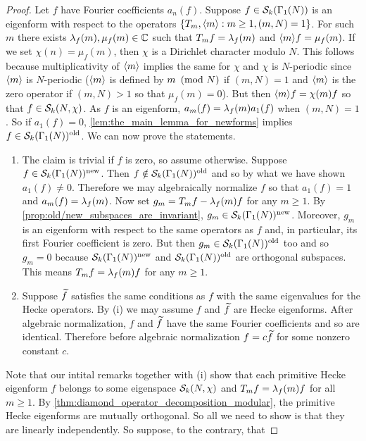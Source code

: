       \begin{proof}
        Let $f$ have Fourier coefficients $a_{n}(f)$. Suppose $f \in \mathcal{S}_{k}(\Gamma_{1}(N))$ is an eigenform with respect to the operators $\{T_{m},\langle m\rangle:m \ge 1, (m,N) = 1\}$. For such $m$ there exists $\lambda_{f}(m),\mu_{f}(m) \in \mathbb{C}$ such that $T_{m}f = \lambda_{f}(m)$ and $\langle m\rangle f = \mu_{f}(m)$. If we set $\chi(n) = \mu_{f}(m)$, then $\chi$ is a Dirichlet character modulo $N$. This follows because multiplicativity of $\langle m\rangle$ implies the same for $\chi$ and $\chi$ is $N$-periodic since $\langle m\rangle$ is $N$-periodic ($\langle m\rangle$ is defined by $m \ \left(\text{mod }N\right)$ if $(m,N) = 1$ and $\langle m\rangle$ is the zero operator if $(m,N) > 1$ so that $\mu_{f}(m) = 0$). But then $\langle m\rangle f = \chi(m)f$ so that $f \in \mathcal{S}_{k}(N,\chi)$. As $f$ is an eigenform, $a_{m}(f) = \lambda_{f}(m)a_{1}(f)$ when $(m,N) = 1$. So if $a_{1}(f) = 0$, \cref{lem:the_main_lemma_for_newforms} implies $f \in \mathcal{S}_{k}(\Gamma_{1}(N))^{\mathrm{old}}$. We can now prove the statements.
        \begin{enumerate}[label=(\roman*)]
          \item The claim is trivial if $f$ is zero, so assume otherwise. Suppose $f \in \mathcal{S}_{k}(\Gamma_{1}(N))^{\mathrm{new}}$. Then $f \notin \mathcal{S}_{k}(\Gamma_{1}(N))^{\mathrm{old}}$ and so by what we have shown $a_{1}(f) \neq 0$. Therefore we may algebraically normalize $f$ so that $a_{1}(f) = 1$ and $a_{m}(f) = \lambda_{f}(m)$. Now set $g_{m} = T_{m}f-\lambda_{f}(m)f$ for any $m \ge 1$. By \cref{prop:old/new_subspaces_are_invariant}, $g_{m} \in \mathcal{S}_{k}(\Gamma_{1}(N))^{\mathrm{new}}$. Moreover, $g_{m}$ is an eigenform with respect to the same operators as $f$ and, in particular, its first Fourier coefficient is zero. But then $g_{m} \in \mathcal{S}_{k}(\Gamma_{1}(N))^{\mathrm{old}}$ too and so $g_{m} = 0$ because $\mathcal{S}_{k}(\Gamma_{1}(N))^{\mathrm{new}}$ and $\mathcal{S}_{k}(\Gamma_{1}(N))^{\mathrm{old}}$ are orthogonal subspaces. This means $T_{m}f = \lambda_{f}(m)f$ for any $m \ge 1$.
          \item Suppose $\widetilde{f}$ satisfies the same conditions as $f$ with the same eigenvalues for the Hecke operators. By (i) we may assume $f$ and $\widetilde{f}$ are Hecke eigenforms. After algebraic normalization, $f$ and $\widetilde{f}$ have the same Fourier coefficients and so are identical. Therefore before algebraic normalization $f = c\widetilde{f}$ for some nonzero constant $c$.
        \end{enumerate}
        Note that our intital remarks together with (i) show that each primitive Hecke eigenform $f$ belongs to some eigenspace $\mathcal{S}_{k}(N,\chi)$ and $T_{m}f = \lambda_{f}(m)f$ for all $m \ge 1$. By \cref{thm:diamond_operator_decomposition_modular}, the primitive Hecke eigenforms are mutually orthogonal. So all we need to show is that they are linearly independently. So suppose, to the contrary, that

\end{proof}
